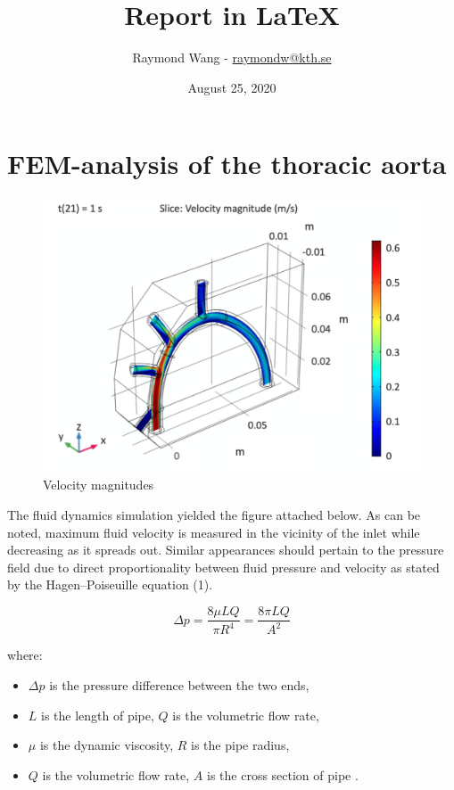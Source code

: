\documentclass[12pt]{article}
\title{Report in \LaTeX}
\date{August 25, 2020}
\author{Raymond Wang - 
\url{raymondw@kth.se}}
\begin{document}
\maketitle
\tableofcontents

\newpage 
\section{FEM-analysis of the thoracic aorta}

\begin{figure}
\centering
\includegraphics[width=.98\linewidth]{velocity}
\caption{Velocity magnitudes}
\end{figure}

The fluid dynamics simulation yielded the figure attached below. As can be noted, maximum fluid velocity is measured in the vicinity of the inlet while decreasing as it spreads out. Similar appearances should pertain to the pressure field due to direct proportionality between fluid pressure and velocity as stated by the Hagen–Poiseuille equation (1).

\begin{equation}
    \Delta p = \frac{8\mu LQ}{\pi R^{4}} = \frac{8 \pi LQ}{A^{2}}
\end{equation}

\noindent where: 
\begin{itemize}
    \item[] $\Delta p$ is the pressure difference between the two ends,
    \item[] $L$ is the length of pipe, \hspace{0.2cm} $Q$  is the volumetric flow rate,
    \item[] $\mu$ is the dynamic viscosity,
    $R$ is the pipe radius,
    \item[] $Q$  is the volumetric flow rate,
    $A$ is the cross section of pipe \cite{vogel2020life}.
\end{itemize}
\end{document}
